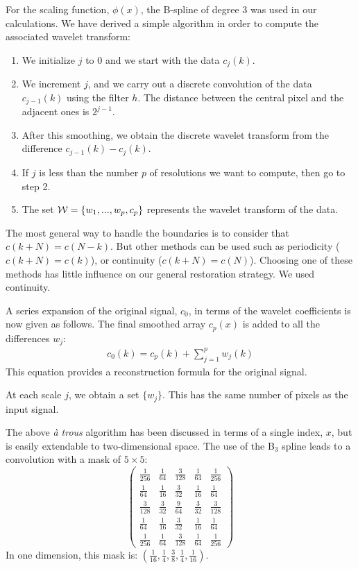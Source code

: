 For the scaling function, $\phi(x)$, the B-spline of degree 3 
was used in our calculations.     
We have derived a simple algorithm in order to compute the 
associated wavelet transform:
\begin{enumerate}
\item We initialize $j$ to 0 and we start with the data $c_j(k)$.
\item We increment $j$, and we carry out a discrete convolution of the data
$c_{j-1}(k)$ using  the filter $h$. The distance between the central pixel
and the adjacent ones is $2^{j-1}$.
\item After this smoothing, we obtain the discrete wavelet transform
from the difference $c_{j-1}(k) - c_j(k)$.
\item If $j$ is less than the number $p$ of resolutions we want to
compute, then go to step 2.
\item The set ${\cal W} = \{ w_1, ..., w_p, c_p \}$ represents the
wavelet transform of the data.
\end{enumerate}


The most general way to handle the boundaries is to consider
that $c(k + N) = c(N - k)$. But other methods can be used
such as periodicity ($c(k + N) = c(k)$), or continuity
 ($c(k + N) = c(N)$).  Choosing one of these methods has little influence 
on our general restoration strategy.  We used continuity.  
 
A series expansion of the original signal, $c_0$, 
in terms of
the wavelet coefficients is now given as follows. 
The final smoothed array $c_{p}(x)$ is added to all the differences $w_j$:
\begin{eqnarray}
c_0(k) = c_{p}(k) + \sum_{j=1}^{p} w_j(k)
\end{eqnarray}
 This equation provides a reconstruction formula for the original signal.
 
At each scale $j$, we obtain a set $\{w_j\}$.  This has 
the same number of pixels as the input signal. 

The above {\em \`a trous} algorithm has been discussed in terms of a single
index, $x$, but is easily extendable to 
two-dimensional space.  The use of the B$_3$ spline leads to a 
convolution with a mask of $5 \times 5$:
$$ 
\left(    \begin{array}{ccccc}
\frac{1}{256} & \frac{1}{64} & \frac{3}{128} & \frac{1}{64} & \frac{1}{256} \\
\frac{1}{64}  & \frac{1}{16} & \frac{3}{32}  & \frac{1}{16} & \frac{1}{64}  \\
\frac{3}{128} & \frac{3}{32} & \frac{9}{64}  & \frac{3}{32} & \frac{3}{128} \\
\frac{1}{64}  & \frac{1}{16} & \frac{3}{32}  & \frac{1}{16} & \frac{1}{64}  \\
\frac{1}{256} & \frac{1}{64} & \frac{3}{128} & \frac{1}{64} & \frac{1}{256} 
\end{array} \right)
$$
In one dimension, this mask is:
$ ( \frac{1}{16}, \frac{1}{4}, \frac{3}{8},
\frac{1}{4}, \frac{1}{16} ) $.
 
